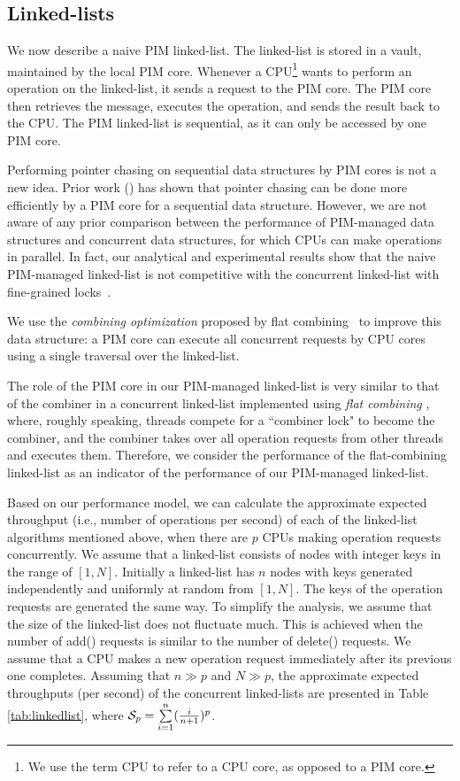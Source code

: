 \subsection{Linked-lists}
\label{section:linked_list}
We now describe a naive PIM linked-list.
The linked-list is stored in a vault, maintained by the local PIM core.
Whenever a CPU\footnote{We use the term CPU to refer to a CPU core, as opposed to a PIM core.} 
wants to perform an operation on the linked-list,
it sends a request to the PIM core.
The PIM core then retrieves the message, executes the operation, and sends the result back to the CPU.
The PIM linked-list is sequential, as it can only be accessed by one PIM core. 

Performing pointer chasing on sequential data structures by PIM cores is not a new idea. 
Prior work (\cite{hsieh2016accelerating, Ahn2015:2, Hashemi:2016}) has shown that 
pointer chasing can be done more efficiently by a PIM core for a sequential data structure.
However, we are not aware of any prior comparison between the performance of
PIM-managed data structures and concurrent data structures, 
for which CPUs can make operations in parallel.
In fact, our analytical and experimental results show that 
the naive PIM-managed linked-list is not competitive with 
the concurrent linked-list with fine-grained locks~\cite{Heller05}.

We use the \textit{combining optimization} proposed by 
flat combining~\cite{Hendler10} to improve this data structure:
a PIM core can execute all concurrent requests by CPU cores using a single 
traversal over the linked-list. 

The role of the PIM core in our PIM-managed linked-list
is very similar to that of the combiner in a concurrent linked-list implemented
using \textit{flat combining} \cite{Hendler10}, where, roughly speaking,
threads compete for a ``combiner lock" to become the combiner, and
the combiner takes over all operation requests from other threads and executes them.
Therefore, we consider the performance of the flat-combining linked-list as an indicator 
of the performance of our PIM-managed linked-list.

Based on our performance model, we can calculate the approximate expected throughput 
(i.e., number of operations per second) of each of the linked-list algorithms mentioned above, 
when there are $p$ CPUs making operation requests concurrently.
We assume that a linked-list consists of nodes with integer keys in the range of $[1, N]$.
Initially a linked-list has $n$ nodes with keys generated independently
and uniformly at random from $[1, N]$.
The keys of the operation requests are generated the same way.
To simplify the analysis, we assume that the size of the linked-list does not fluctuate much. 
This is achieved when the number of add() requests is similar to the number of delete() requests. 
We assume that a CPU makes a new operation request immediately after
its previous one completes.
Assuming that $n \gg p$ and $N \gg p$, the approximate expected throughputs (per second) 
of the concurrent linked-lists are presented in Table \ref{tab:linkedlist}, 
where $\mathcal{S}_{p} = \sum\limits_{i=1}^{n} ({i \over n+1})^{p}$.

